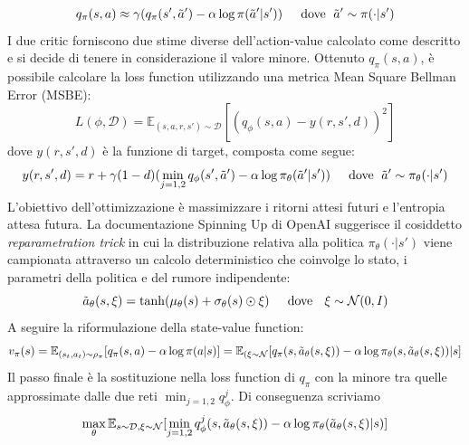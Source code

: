 \begin{equation}
    q_\pi(s,a) \approx \gamma (q_\pi(s',\Tilde{a}')-\alpha \log\pi(\Tilde{a}'|s'))\;\;\;\;\text{ dove }\;\Tilde{a}'\sim \pi(\cdot|s')
\end{equation}
I due critic forniscono due stime diverse dell'action-value calcolato come descritto e si decide di tenere in considerazione il valore minore. Ottenuto $q_\pi(s,a)$, è possibile calcolare la loss function utilizzando una metrica Mean Square Bellman Error (MSBE):
\begin{equation}
    L(\phi,\mathcal{D})= \mathbb{E}_{(s,a,r,s')\sim\mathcal{D}}[(q_\phi(s,a)-y(r,s',d))^2]
\end{equation}
dove $y(r,s',d)$ è la funzione di target, composta come segue:
\begin{equation}
    y(r,s',d)=r + \gamma(1-d) (\min_{j=1,2}q_\phi(s',\Tilde{a}')-\alpha \log\pi_\theta(\Tilde{a}'|s'))\;\;\;\; \text{ dove }\;\Tilde{a}'\sim \pi_\theta(\cdot|s')
\end{equation}
L'obiettivo dell'ottimizzazione è massimizzare i ritorni attesi futuri e l'entropia attesa futura. La documentazione Spinning Up di OpenAI \cite{openaiSAC2023} suggerisce il cosiddetto \textit{reparametration trick} in cui la distribuzione relativa alla politica $\pi_\theta(\cdot|s')$ viene campionata attraverso un calcolo deterministico che coinvolge lo stato, i parametri della politica e del rumore indipendente:
\begin{equation}
    \Tilde{a}_\theta (s,\xi) = \tanh (\mu_\theta(s)+\sigma_\theta(s)\odot\xi) \;\;\;\; \text{ dove }\;\ \xi \sim \mathcal{N}(0,I)
\end{equation}
A seguire la riformulazione della state-value function:
\begin{equation}
     v_\pi(s)= \mathbb{E}_{(s_t,a_t)\sim \rho_\pi}[q_\pi(s,a)-\alpha \log\pi(a|s)]=\mathbb{E}_{(\xi\sim \mathcal{N}}[q_\pi(s,\Tilde{a}_\theta(s,\xi))-\alpha \log \pi_\theta(s,\Tilde{a}_\theta(s,\xi))|s]
\end{equation}
Il passo finale è la sostituzione nella loss function di $q_\pi$ con la minore tra quelle approssimate dalle due reti $\min_{j=1,2} q_\phi^j$. Di conseguenza scriviamo
\begin{equation}
    \max_\theta \mathbb{E}_{s\sim\mathcal{D},\xi\sim \mathcal{N}}[\min_{j=1,2} q_\phi^j(s,\Tilde{a}_\theta(s,\xi))-\alpha \log \pi_\theta(\Tilde{a}_\theta(s,\xi)|s)]
\end{equation}

